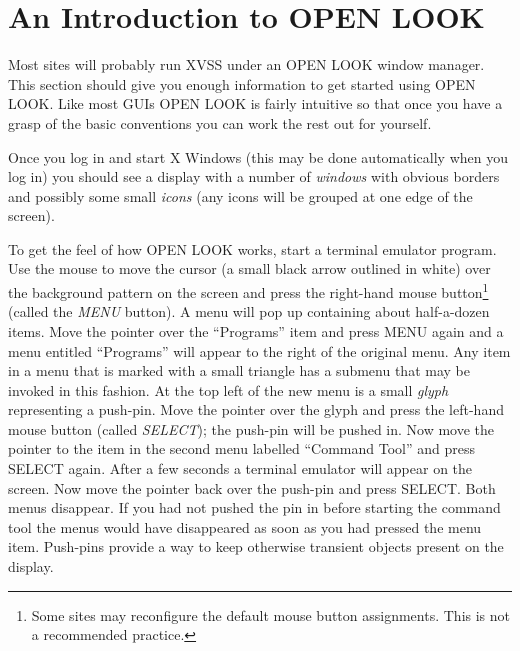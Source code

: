 \section{An Introduction to OPEN LOOK}

Most sites will probably run XVSS under an OPEN LOOK window manager.
This section should give you enough information to get started using
OPEN LOOK. Like most GUIs OPEN LOOK is fairly intuitive so that once
you have a grasp of the basic conventions you can work the rest out
for yourself.

Once you log in and start X Windows (this may be done automatically
when you log in) you should see a display with a number of {\em
windows} with obvious borders and possibly some small {\em icons} (any
icons will be grouped at one edge of the screen).

To get the feel of how OPEN LOOK works, start a terminal emulator
program. Use the mouse to move the cursor (a small black arrow
outlined in white) over the background pattern on the screen and press
the right-hand mouse button\footnote{Some sites may reconfigure the
default mouse button assignments. This is not a recommended practice.}
(called the {\em MENU} button). A menu will pop up containing about
half-a-dozen items. Move the pointer over the ``Programs'' item and
press MENU again and a menu entitled ``Programs'' will appear to the
right of the original menu. Any item in a menu that is marked with a
small triangle has a submenu that may be invoked in this fashion. At
the top left of the new menu is a small {\em glyph} representing a
push-pin. Move the pointer over the glyph and press the left-hand
mouse button (called {\em SELECT}); the push-pin will be pushed in.
Now move the pointer to the item in the second menu labelled ``Command
Tool'' and press SELECT again. After a few seconds a terminal emulator
will appear on the screen. Now move the pointer back over the push-pin
and press SELECT. Both menus disappear. If you had not pushed the pin
in before starting the command tool the menus would have disappeared
as soon as you had pressed the menu item. Push-pins provide a way to
keep otherwise transient objects present on the display.

